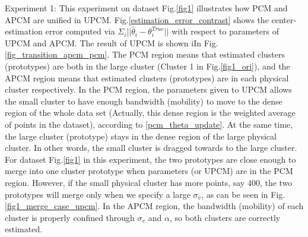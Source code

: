 \documentclass[journal]{IEEEtran}
\theoremstyle{definition}
\begin{document}
Experiment 1: This experiment on dataset Fig.\ref{fig1} illustrates how PCM and APCM are unified in UPCM.
Fig.\ref{estimation_error_contrast} shows the center-estimation error computed via $\Sigma_i||\hat{\theta}_i-\theta_i^{True}||$ with respect to parameters of UPCM and APCM. 
The result of UPCM is shown iIn Fig.\ref{fig_transition_apcm_pcm}. The PCM region means that estimated clusters (prototypes) are both in the large cluster (Cluster 1 in Fig.\ref{fig1_ori}), and the APCM region means that estimated clusters (prototypes) are in each physical cluster respectively.
In the PCM region, the parameters given to UPCM allows the small cluster to have enough bandwidth (mobility) to move to the dense region of the whole data set (Actually, this dense region is the weighted average of points in the dataset), according to \eqref{pcm_theta_update}. At the same time, the large cluster (prototype) stays in the dense region of the large physical cluster. In other words, the small cluster is dragged towards to the large cluster. For dataset Fig.\ref{fig1} in this experiment, the two prototypes are close enough to merge into one cluster prototype when parameters (or UPCM) are in the PCM region. However, if the small physical cluster has more points, say 400, the two prototypes will merge only when we specify a large $\sigma_v$, as can be seen in Fig.\ref{fig1_merge_case_upcm}.
In the APCM region, the bandwidth (mobility) of each cluster is properly confined through $\sigma_v$ and $\alpha$, so both clusters are correctly estimated.
\end{document}
